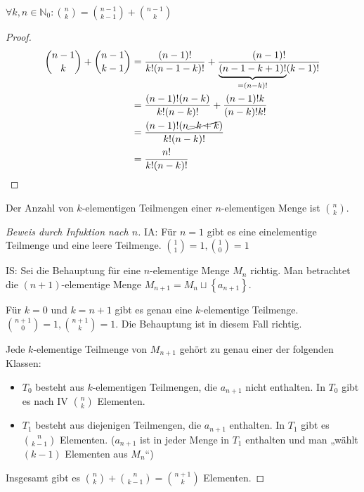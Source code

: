 \begin{lemma}
  $\forall k, n \in \mathbb{N}_0: \binom{n}{k} = \binom{n-1}{k-1} + \binom{n-1}{k}$
\end{lemma}
\begin{proof}
  \begin{align*}
    \binom{n-1}{k} + \binom{n-1}{k-1} &= \frac{(n-1)!}{k! (n-1-k)!} + \frac{(n-1)!}{\underbrace{(n-1-k+1)!}_{= (n-k)!} (k-1)!} \\
    \,&= \frac{(n-1)! (n-k)}{k! (n-k)!} + \frac{(n-1)! k}{(n-k)! k!} \\
    \,&= \frac{(n-1)! (n \cancel{-k+k})}{k! (n-k)!} \\
    \,&= \frac{n!}{k! (n-k)!}
  \end{align*}
\end{proof}
\begin{theorem}
  Der Anzahl von $k$-elementigen Teilmengen einer $n$-elementigen Menge ist $\binom{n}{k}$.
\end{theorem}
\begin{proof}[Beweis durch Infuktion nach $n$]
  IA: Für $n = 1$ gibt es eine einelementige Teilmenge und eine leere Teilmenge. $\binom{1}{1} = 1, \binom{1}{0} = 1$

  IS: Sei die Behauptung für eine $n$-elementige Menge $M_n$ richtig. Man betrachtet die $(n+1)$-elementige Menge $M_{n+1} = M_n \sqcup \left\{ a_{n+1} \right\}$.
  
  Für $k = 0$ und $k = n+1$ gibt es genau eine $k$-elementige Teilmenge. $\binom{n+1}{0} = 1, \binom{n+1}{k} = 1$. Die Behauptung ist in diesem Fall richtig.

  Jede $k$-elementige Teilmenge von $M_{n+1}$ gehört zu genau einer der folgenden Klassen:
  \begin{itemize}
  \item $T_0$ besteht aus $k$-elementigen Teilmengen, die $a_{n+1}$ nicht enthalten. In $T_0$ gibt es nach IV $\binom{n}{k}$ Elementen.
  \item $T_1$ besteht aus diejenigen Teilmengen, die $a_{n+1}$ enthalten. In $T_1$ gibt es $\binom{n}{k-1}$ Elementen. ($a_{n+1}$ ist in jeder Menge in $T_1$ enthalten und man „wählt $(k-1)$ Elementen aus $M_n$“)
  \end{itemize}
  Insgesamt gibt es $\binom{n}{k} + \binom{n}{k-1} = \binom{n+1}{k}$ Elementen.
\end{proof}

